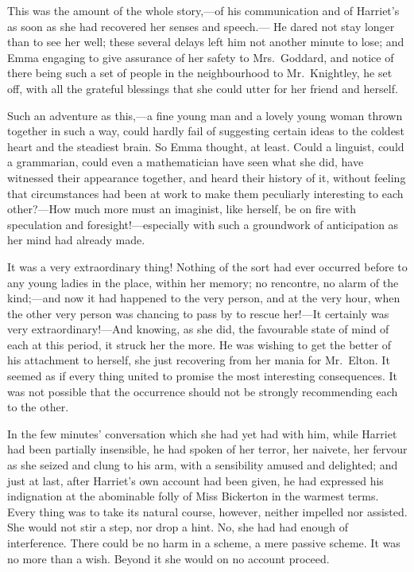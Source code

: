 This was the amount of the whole story,---of his communication and
of Harriet's as soon as she had recovered her senses and speech.---%
He dared not stay longer than to see her well; these several delays
left him not another minute to lose; and Emma engaging to give
assurance of her safety to Mrs.\ Goddard, and notice of there
being such a set of people in the neighbourhood to Mr.\ Knightley,
he set off, with all the grateful blessings that she could utter
for her friend and herself.

Such an adventure as this,---a fine young man and a lovely young
woman thrown together in such a way, could hardly fail of suggesting
certain ideas to the coldest heart and the steadiest brain.
So Emma thought, at least.  Could a linguist, could a grammarian,
could even a mathematician have seen what she did, have witnessed their
appearance together, and heard their history of it, without feeling
that circumstances had been at work to make them peculiarly interesting
to each other?---How much more must an imaginist, like herself,
be on fire with speculation and foresight!---especially with such
a groundwork of anticipation as her mind had already made.

It was a very extraordinary thing!  Nothing of the sort had ever
occurred before to any young ladies in the place, within her memory;
no rencontre, no alarm of the kind;---and now it had happened
to the very person, and at the very hour, when the other very
person was chancing to pass by to rescue her!---It certainly
was very extraordinary!---And knowing, as she did, the favourable
state of mind of each at this period, it struck her the more.
He was wishing to get the better of his attachment to herself,
she just recovering from her mania for Mr.\ Elton.  It seemed as if
every thing united to promise the most interesting consequences.
It was not possible that the occurrence should not be strongly
recommending each to the other.

In the few minutes' conversation which she had yet had with him,
while Harriet had been partially insensible, he had spoken of her terror,
her naivete, her fervour as she seized and clung to his arm, with a
sensibility amused and delighted; and just at last, after Harriet's
own account had been given, he had expressed his indignation
at the abominable folly of Miss Bickerton in the warmest terms.
Every thing was to take its natural course, however, neither impelled
nor assisted.  She would not stir a step, nor drop a hint.
No, she had had enough of interference.  There could be no harm
in a scheme, a mere passive scheme.  It was no more than a wish.
Beyond it she would on no account proceed.

